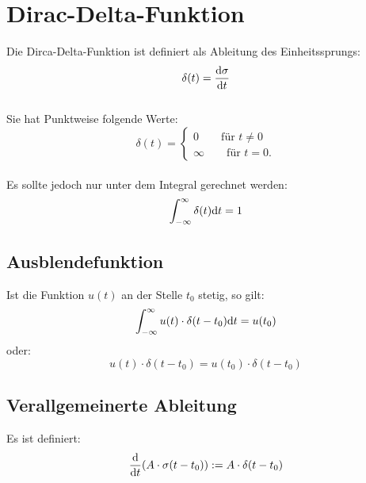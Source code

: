 



\newpage
\section{Dirac-Delta-Funktion}
Die Dirca-Delta-Funktion ist definiert als Ableitung des Einheitssprungs:
\[
	\delta(t) = \frac{\mathrm{d} \sigma}{\mathrm{d} t}
\]
\\
Sie hat Punktweise folgende Werte:
\[
	\delta(t) = \left\lbrace \begin{matrix}
		0 \qquad \text{für }t \neq 0\\
		\infty \qquad \text{für }t = 0.
	\end{matrix} \right.
\]
\\
Es sollte jedoch nur unter dem Integral gerechnet werden:
\[
	\int_{-\infty}^{\infty} \delta(t) \mathrm{d} t = 1
\]

\subsection{Ausblendefunktion}
Ist die Funktion $u(t)$ an der Stelle $t_0$ stetig, so gilt:
\[
	\int_{-\infty}^{\infty} u(t) \cdot \delta(t-t_0) \mathrm{d} t = u(t_0)
\]
oder:
\[
	u(t) \cdot \delta(t-t_0) = u(t_0) \cdot \delta(t-t_0)
\]

\subsection{Verallgemeinerte Ableitung}
Es ist definiert:
\[
	\frac{\mathrm{d} }{\mathrm{d} t}(A \cdot \sigma(t-t_0)) := A \cdot \delta(t-t_0)
\]